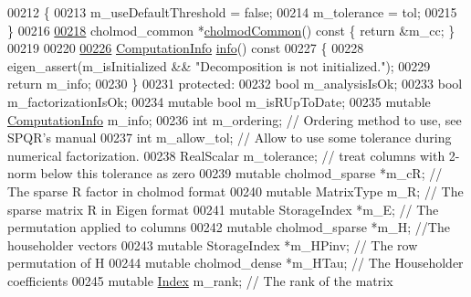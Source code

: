 \begin{DoxyCode}
00212     \{
00213       m\_useDefaultThreshold = \textcolor{keyword}{false};
00214       m\_tolerance = tol;
00215     \}
00216     
\hyperlink{class_eigen_1_1_s_p_q_r_a8c7d48d51a1fb08a3e27b8499e5c7f49}{00218}     cholmod\_common *\hyperlink{class_eigen_1_1_s_p_q_r_a8c7d48d51a1fb08a3e27b8499e5c7f49}{cholmodCommon}()\textcolor{keyword}{ const }\{ \textcolor{keywordflow}{return} &m\_cc; \}
00219     
00220     
\hyperlink{class_eigen_1_1_s_p_q_r_a3ab7bacba8d2be20adc10b4d5b6c071f}{00226}     \hyperlink{group__enums_ga85fad7b87587764e5cf6b513a9e0ee5e}{ComputationInfo} \hyperlink{class_eigen_1_1_s_p_q_r_a3ab7bacba8d2be20adc10b4d5b6c071f}{info}()\textcolor{keyword}{ const}
00227 \textcolor{keyword}{    }\{
00228       eigen\_assert(m\_isInitialized && \textcolor{stringliteral}{"Decomposition is not initialized."});
00229       \textcolor{keywordflow}{return} m\_info;
00230     \}
00231   \textcolor{keyword}{protected}:
00232     \textcolor{keywordtype}{bool} m\_analysisIsOk;
00233     \textcolor{keywordtype}{bool} m\_factorizationIsOk;
00234     \textcolor{keyword}{mutable} \textcolor{keywordtype}{bool} m\_isRUpToDate;
00235     \textcolor{keyword}{mutable} \hyperlink{group__enums_ga85fad7b87587764e5cf6b513a9e0ee5e}{ComputationInfo} m\_info;
00236     \textcolor{keywordtype}{int} m\_ordering; \textcolor{comment}{// Ordering method to use, see SPQR's manual}
00237     \textcolor{keywordtype}{int} m\_allow\_tol; \textcolor{comment}{// Allow to use some tolerance during numerical factorization.}
00238     RealScalar m\_tolerance; \textcolor{comment}{// treat columns with 2-norm below this tolerance as zero}
00239     \textcolor{keyword}{mutable} cholmod\_sparse *m\_cR; \textcolor{comment}{// The sparse R factor in cholmod format}
00240     \textcolor{keyword}{mutable} MatrixType m\_R; \textcolor{comment}{// The sparse matrix R in Eigen format}
00241     \textcolor{keyword}{mutable} StorageIndex *m\_E; \textcolor{comment}{// The permutation applied to columns}
00242     \textcolor{keyword}{mutable} cholmod\_sparse *m\_H;  \textcolor{comment}{//The householder vectors}
00243     \textcolor{keyword}{mutable} StorageIndex *m\_HPinv; \textcolor{comment}{// The row permutation of H}
00244     \textcolor{keyword}{mutable} cholmod\_dense *m\_HTau; \textcolor{comment}{// The Householder coefficients}
00245     \textcolor{keyword}{mutable} \hyperlink{namespace_eigen_a62e77e0933482dafde8fe197d9a2cfde}{Index} m\_rank; \textcolor{comment}{// The rank of the matrix}

\end{DoxyCode}
